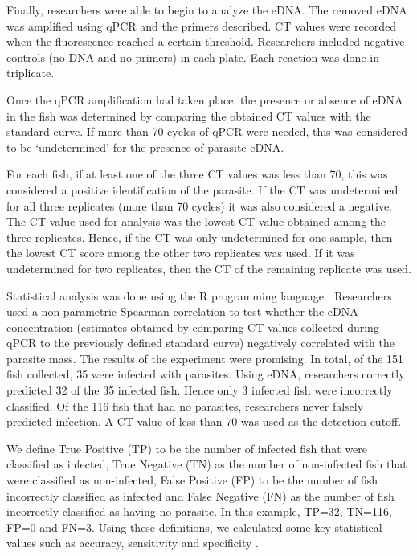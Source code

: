 \vspace{5mm}

Finally, researchers were able to begin to analyze the eDNA. The removed eDNA was amplified using qPCR and the primers described. CT values were recorded when the fluorescence reached a certain threshold. Researchers included negative controls (no DNA and no primers) in each plate. Each reaction was done in triplicate. 

\vspace{5mm}

 Once the qPCR amplification had taken place, the presence or absence of eDNA in the fish was determined by comparing the obtained CT values with the standard curve. If more than 70 cycles of qPCR were needed, this was considered to be `undetermined' for the presence of parasite eDNA.

\vspace{5mm}
 For each fish, if at least one of the three CT values was less than 70, this was considered a positive identification of the parasite. If the CT was undetermined for all three replicates (more than 70 cycles) it was also considered a negative. The CT value used for analysis was the lowest CT value obtained among the three replicates. Hence, if the CT was only undetermined for one sample, then the lowest CT score among the other two replicates was used. If it was undetermined for two replicates, then the CT of the remaining replicate was used.

\vspace{5mm}

Statistical analysis was done using the R programming language \citep{Rprogram}. Researchers used a non-parametric Spearman correlation to test whether the eDNA concentration (estimates obtained by comparing CT values collected during qPCR to the previously defined standard curve) negatively correlated with the parasite mass. The results of the experiment were promising. In total, of the 151 fish collected, 35 were infected with parasites. Using eDNA, researchers correctly predicted 32 of the 35 infected fish. Hence only 3 infected fish were incorrectly classified. Of the 116 fish that had no parasites, researchers never falsely predicted infection. A CT value of less than 70 was used as the detection cutoff.

\vspace{5mm}

We define True Positive (TP) to be the number of infected fish that were classified as infected, True Negative (TN) as the number of non-infected fish that were classified as non-infected, False Positive (FP) to be the number of fish incorrectly classified as infected and False Negative (FN) as the number of fish incorrectly classified as having no parasite. In this example, TP=32,
TN=116, FP=0 and FN=3. Using these definitions, we calculated some key statistical values such as accuracy, sensitivity and specificity \citep{statisticallearning}. 

